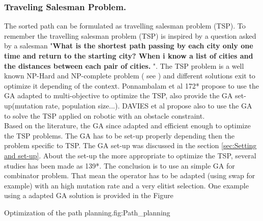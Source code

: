 \subsubsection*{Traveling Salesman Problem. }\label{sec:TSP2}



The sorted path can be formulated as travelling salesman problem (TSP). To remember the travelling salesman problem (TSP) is inspired by a question asked by a salesman  "\textbf{What is the shortest path passing by each city only one time and return to the starting city? When i know a list of cities and the distances between each pair of cities. }". The TSP problem is a well known NP-Hard and NP-complete problem ( see \citep{236*karp1972}) and different solutions exit to optimize it depending of the context. 
Ponnambalam et al 172* \cite{172*} propose to use the GA adapted to  multi-objective to optimize the TSP, also provide the GA set-up(mutation rate, population size...). DAVIES et al \cite{56*davies2006} propose also to use the GA to solve the TSP applied on robotic with an obstacle constraint. \\
Based on the literature, the GA since adapted and efficient enough to optimize the TSP problems.
The GA  has to be set-up properly depending then the problem specific to TSP. The GA set-up was discussed in the section \ref{sec:Setting and set-up}. About the set-up the more appropriate to optimize the TSP, several studies has been made  as  \citep{68*muhlenbein1989,80*serpell2010,139*razali2011}139*. The conclusion is to use an simple GA for combinator problem. That mean the operator has to be adapted (using swap for example) with an high mutation rate and a very elitist selection.
One example  using a adapted GA solution is provided in the Figure 

\begin{mfigures}[!]{Optimization of the path planning.}{fig:Path_planning} \centering
{}
\hspace{1cm}
\end{mfigures}	

